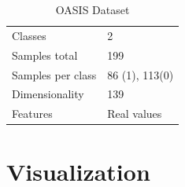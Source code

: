 \begin{table}
	\caption{OASIS Dataset}
	\label{tab:dataset}
	\centering
	\begin{tabular}{lp{4cm}}
		\hline 
		Classes & 2\\
		Samples total & 199 \\
		Samples per class & 86 (1), 113(0) \\
		Dimensionality & 139 \\
		Features & Real values \\ \hline
	\end{tabular}
\end{table}


%
%
%

%
%

\section{Visualization}

